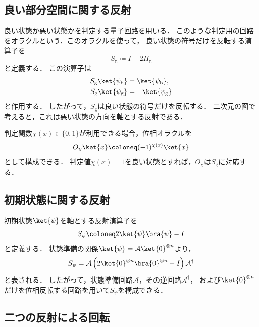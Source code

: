 \subsection{良い部分空間に関する反射}
\label{subsec:good-subspace-reflection}

良い状態か悪い状態かを判定する量子回路を用いる．
このような判定用の回路をオラクルという．このオラクルを使って，
良い状態の符号だけを反転する演算子を
\begin{equation}
  S_{\mathrm{g}}
  \coloneq
  I-2\Pi_{\mathrm{g}}
  \label{eq:good-state-reflection}
\end{equation}
と定義する．
この演算子は
\begin{align*}
  S_{\mathrm{g}}\ket{\psi_{\mathrm{b}}}
  &=
  \ket{\psi_{\mathrm{b}}},\\
  S_{\mathrm{g}}\ket{\psi_{\mathrm{g}}}
  &=
  -\ket{\psi_{\mathrm{g}}}
\end{align*}
と作用する．
したがって，$S_{\mathrm{g}}$は良い状態の符号だけを反転する．
二次元の図で考えると，これは悪い状態の方向を軸とする反射である．

判定関数$\chi(x)\in\{0,1\}$が利用できる場合，位相オラクルを
\begin{equation}
  O_{\chi}\ket{x}
  \coloneq
  (-1)^{\chi(x)}\ket{x}
  \label{eq:phase-oracle}
\end{equation}
として構成できる．
判定値$\chi(x)=1$を良い状態とすれば，$O_{\chi}$は$S_{\mathrm{g}}$に対応する．

\subsection{初期状態に関する反射}
\label{subsec:initial-state-reflection}

初期状態$\ket{\psi}$を軸とする反射演算子を
\begin{equation}
  S_{\psi}
  \coloneq
  2\ket{\psi}\bra{\psi}-I
  \label{eq:initial-state-reflection}
\end{equation}
と定義する．
状態準備の関係$\ket{\psi}=\mathcal{A}\ket{0}^{\otimes n}$より，
\begin{equation}
  S_{\psi}
  =
  \mathcal{A}
  \left(
    2\ket{0}^{\otimes n}\bra{0}^{\otimes n}-I
  \right)
  \mathcal{A}^{\dagger}
  \label{eq:prepared-state-reflection}
\end{equation}
と表される．
したがって，状態準備回路$\mathcal{A}$，その逆回路$\mathcal{A}^{\dagger}$，
および$\ket{0}^{\otimes n}$だけを位相反転する回路を用いて$S_{\psi}$を構成できる．

\subsection{二つの反射による回転}
\label{subsec:two-reflections-as-rotation}

